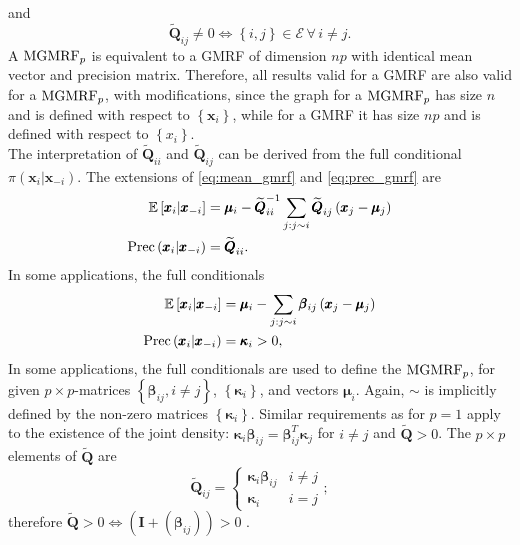 and
\begin{equation*}
    \widetilde{\pmb{Q}}_{ij}\neq0\Longleftrightarrow\left\lbrace i,j\right\rbrace\in\mathcal{E}\,\forall\,i\neq j.
\end{equation*}
A $\hbox{MGMRF}_p$ is equivalent to a GMRF of dimension $np$ with identical mean vector and precision matrix.  Therefore, all results valid for a GMRF are also valid for a $\hbox{MGMRF}_p$, with modifications, since the graph for a $\hbox{MGMRF}_p$ has size $n$ and is defined with respect to $\left\lbrace\pmb{x}_i\right\rbrace$, while for a GMRF it has size $np$ and is defined with respect to $\left\lbrace x_i\right\rbrace$.  \\
The interpretation of $\widetilde{\pmb{Q}}_{ii}$ and $\widetilde{\pmb{Q}}_{ij}$ can be derived from the full conditional $\pi\left(\pmb{x}_i|\pmb{x}_{-i}\right)$. The extensions of \eqref{eq:mean_gmrf} and \eqref{eq:prec_gmrf} are
\begin{align}
    \mathbb{E}\left[\pmb{x}_i|\pmb{x}_{-i}\right]&=\pmb{\mu}_i-\widetilde{\pmb{Q}}_{ii}^{-1}\sum_{j:j\sim i}\widetilde{\pmb{Q}}_{ij}\left(\pmb{x}_j-\pmb{\mu}_j\right)\\
    \hbox{Prec}\left(\pmb{x}_i|\pmb{x}_{-i}\right) &= \widetilde{\pmb{Q}}_{ii}.
\end{align}
In some applications, the full conditionals
\begin{align}
    \mathbb{E}\left[\pmb{x}_i|\pmb{x}_{-i}\right] &= \pmb{\mu}_i-\sum_{j:j\sim i}\pmb{\beta}_{ij}\left(\pmb{x}_j-\pmb{\mu}_j\right) \\
    \hbox{Prec}\left(\pmb{x}_i|\pmb{x}_{-i}\right) &= \pmb{\kappa}_i > 0,
\end{align}
In some applications, the full conditionals are used to define the $\hbox{MGMRF}_p$, for given $p\times p$-matrices $\left\lbrace\pmb{\beta}_{ij},i\neq j\right\rbrace$, $\left\lbrace\pmb{\kappa}_i\right\rbrace$, and vectors $\pmb{\mu}_i$. Again, $\sim$ is implicitly defined by the non-zero matrices $\left\lbrace\pmb{\kappa}_i\right\rbrace$. Similar requirements as for $p=1$ apply to the existence of the joint density: $\pmb{\kappa}_i\pmb{\beta}_{ij}=\pmb{\beta}_{ij}^T\pmb{\kappa}_j$ for $i\neq j$ and $\widetilde{\pmb{Q}} > 0$. The $p\times p$ elements of $\widetilde{\pmb{Q}}$ are
\begin{equation*}
    \widetilde{\pmb{Q}}_{ij}=\begin{cases}
    \pmb{\kappa}_i\pmb{\beta}_{ij} & i\neq j \\
    \pmb{\kappa}_i & i=j
    \end{cases};
\end{equation*}
therefore $\widetilde{\pmb{Q}}>0\Longleftrightarrow\left(\pmb{I}+\left(\pmb{\beta}_{ij}\right)\right) > 0$ \autocite[][29--30]{rue2005gaussian}.
